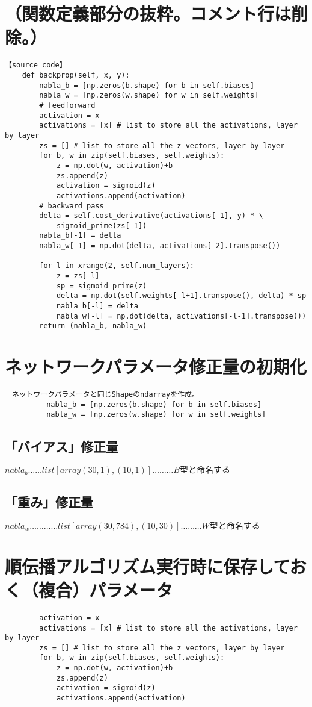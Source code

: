\documentclass[11pt,a4j,fleqn]{jarticle}
\begin{document}
\section{（関数定義部分の抜粋。コメント行は削除。）}
\begin{verbatim}
【source code】
    def backprop(self, x, y):
        nabla_b = [np.zeros(b.shape) for b in self.biases]
        nabla_w = [np.zeros(w.shape) for w in self.weights]
        # feedforward
        activation = x
        activations = [x] # list to store all the activations, layer by layer
        zs = [] # list to store all the z vectors, layer by layer
        for b, w in zip(self.biases, self.weights):
            z = np.dot(w, activation)+b
            zs.append(z)
            activation = sigmoid(z)
            activations.append(activation)
        # backward pass
        delta = self.cost_derivative(activations[-1], y) * \
            sigmoid_prime(zs[-1])
        nabla_b[-1] = delta
        nabla_w[-1] = np.dot(delta, activations[-2].transpose())

        for l in xrange(2, self.num_layers):
            z = zs[-l]
            sp = sigmoid_prime(z)
            delta = np.dot(self.weights[-l+1].transpose(), delta) * sp
            nabla_b[-l] = delta
            nabla_w[-l] = np.dot(delta, activations[-l-1].transpose())
        return (nabla_b, nabla_w)
 \end{verbatim}       
\section{ネットワークパラメータ修正量の初期化}
 \begin{verbatim}  
　ネットワークパラメータと同じShapeのndarrayを作成。
　        nabla_b = [np.zeros(b.shape) for b in self.biases]
        　nabla_w = [np.zeros(w.shape) for w in self.weights]
 \end{verbatim} 
 \subsection{「バイアス」修正量}
$ nabla_b …… list[array(30,1), (10,1)] ………B型と命名する$
 \subsection{「重み」修正量}
 $nabla_w ………… list[ array(30, 784), (10, 30) ]………W型と命名する$

\section{順伝播アルゴリズム実行時に保存しておく（複合）パラメータ} 
\begin{verbatim}
        activation = x
        activations = [x] # list to store all the activations, layer by layer
        zs = [] # list to store all the z vectors, layer by layer
        for b, w in zip(self.biases, self.weights):
            z = np.dot(w, activation)+b
            zs.append(z)
            activation = sigmoid(z)
            activations.append(activation)
\end{verbatim}
\end{document}
